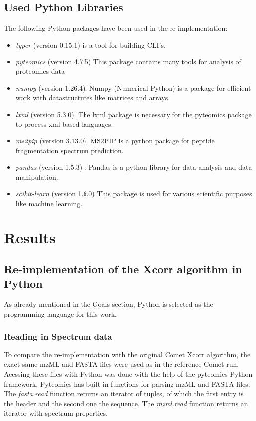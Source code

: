 \documentclass[11pt]{article}
\begin{document}
\subsection{Used Python Libraries}
The following Python packages have been used in the re-implementation:
\begin{itemize}
    \item \textit{typer} (version 0.15.1) is a tool for building CLI's.
    \item \textit{pyteomics} (version 4.7.5) This package contains many tools for analysis of proteomics data \cite{pyteomics, pyteomics-five-years}
    \item \textit{numpy} (version 1.26.4). Numpy (Numerical Python) is a package for efficient work with datastructures like matrices and arrays.
    \item \textit{lxml} (version 5.3.0). The lxml package is necessary for the pyteomics package to process xml based languages.
    \item \textit{ms2pip} (version 3.13.0). MS2PIP is a python package for peptide fragmentation spectrum prediction.
    \item \textit{pandas} (version 1.5.3) . Pandas is a python library for data analysis and data manipulation.
    \item \textit{scikit-learn} (version 1.6.0) This package is used for various scientific purposes like machine learning.
\end{itemize}

\newpage

\section{Results}

\subsection{Re-implementation of the Xcorr algorithm in Python}
As already mentioned in the Goals section, Python is selected as the programming language for this work.

\subsubsection{Reading in Spectrum data}
To compare the re-implementation with the original Comet Xcorr algorithm, the exact same mzML and FASTA files were used as in the reference Comet run. Acessing these files with Python was done with the help of the pyteomics Python framework. Pyteomics has built in functions for parsing mzML and FASTA files. The \textit{fasta.read} function returns an iterator of tuples, of which the first entry is the header and the second one the sequence. The \textit{mzml.read} function returns an iterator with spectrum properties.
\end{document}
